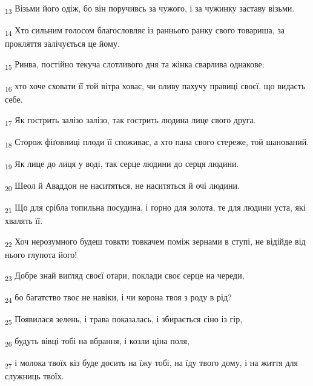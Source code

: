 \begin{tcolorbox}
\textsubscript{13} Візьми його одіж, бо він поручивсь за чужого, і за чужинку заставу візьми.
\end{tcolorbox}
\begin{tcolorbox}
\textsubscript{14} Хто сильним голосом благословляє із раннього ранку свого товариша, за прокляття залічується це йому.
\end{tcolorbox}
\begin{tcolorbox}
\textsubscript{15} Ринва, постійно текуча слотливого дня та жінка сварлива однакове:
\end{tcolorbox}
\begin{tcolorbox}
\textsubscript{16} хто хоче сховати її той вітра ховає, чи оливу пахучу правиці своєї, що видасть себе.
\end{tcolorbox}
\begin{tcolorbox}
\textsubscript{17} Як гострить залізо залізо, так гострить людина лице свого друга.
\end{tcolorbox}
\begin{tcolorbox}
\textsubscript{18} Сторож фіґовниці плоди її споживає, а хто пана свого стереже, той шанований.
\end{tcolorbox}
\begin{tcolorbox}
\textsubscript{19} Як лице до лиця у воді, так серце людини до серця людини.
\end{tcolorbox}
\begin{tcolorbox}
\textsubscript{20} Шеол й Аваддон не наситяться, не наситяться й очі людини.
\end{tcolorbox}
\begin{tcolorbox}
\textsubscript{21} Що для срібла топильна посудина, і горно для золота, те для людини уста, які хвалять її.
\end{tcolorbox}
\begin{tcolorbox}
\textsubscript{22} Хоч нерозумного будеш товкти товкачем поміж зернами в ступі, не відійде від нього глупота його!
\end{tcolorbox}
\begin{tcolorbox}
\textsubscript{23} Добре знай вигляд своєї отари, поклади своє серце на череди,
\end{tcolorbox}
\begin{tcolorbox}
\textsubscript{24} бо багатство твоє не навіки, і чи корона твоя з роду в рід?
\end{tcolorbox}
\begin{tcolorbox}
\textsubscript{25} Появилася зелень, і трава показалась, і збирається сіно із гір,
\end{tcolorbox}
\begin{tcolorbox}
\textsubscript{26} будуть вівці тобі на вбрання, і козли ціна поля,
\end{tcolorbox}
\begin{tcolorbox}
\textsubscript{27} і молока твоїх кіз буде досить на їжу тобі, на їду твого дому, і на життя для служниць твоїх.
\end{tcolorbox}
